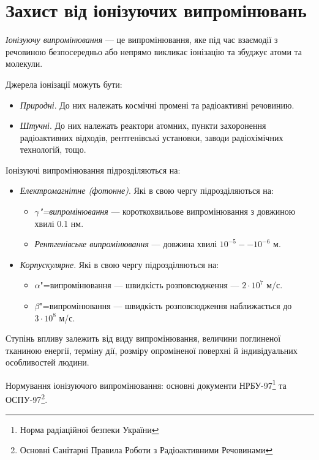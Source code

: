 \documentclass[a4paper,10pt,notitlepage,pdftex,headsepline]{scrartcl}
\begin{document}
\section{Захист від іонізуючих випромінювань}
  \emph{Іонізуючу випромінювання} --- це випромінювання, яке під час взаємодії
  з речовиною безпосередньо або непрямо викликає іонізацію та збуджує атоми та
  молекули.

  Джерела іонізації можуть бути:
  \begin{itemize}
    \item \emph{Природні}.
      До них належать космічні промені та радіоактивні речовинию.
    \item \emph{Штучні}.
      До них належать реактори атомних, пункти захоронення радіоактивних
      відходів, рентгенівські установки, заводи радіохімічних технологій,
      тощо.
  \end{itemize}

  Іонізуючі випромінювання підрозділяються на:
  \begin{itemize}
    \item \emph{Електромагнітне (фотонне)}.
      Які в свою чергу підрозділяються на:
      \begin{itemize}
        \item \emph{$\gamma$"=випромінювання} --- короткохвильове
          випромінювання з довжиною хвилі 0.1 нм.
        \item \emph{Рентгенівське випромінювання} --- довжина хвилі
          $10^{-5}--10^{-6}$ м.
      \end{itemize}
    \item \emph{Корпускулярне}.
      Які в свою чергу підрозділяються на:
      \begin{itemize}
        \item $\alpha$"=випромінювання --- швидкість розповсюдження ---
          $2\cdot 10^{7}$ м/с.
        \item $\beta$"=випромінювання --- швидкість розповсюдження
          наближається до $3\cdot 10^8$ м/с.
      \end{itemize}
  \end{itemize}

  Ступінь впливу залежить від виду випромінювання, величини поглиненої
  тканиною енергії, терміну дії, розміру опроміненої поверхні й індивідуальних
  особливостей людини.

  Нормування іонізуючого випромінювання: основні документи
  НРБУ-97\footnote{Норма радіаційної безпеки України} та
  ОСПУ-97\footnote{Основні Санітарні Правила Роботи з Радіоактивними
  Речовинами}.
\end{document}
